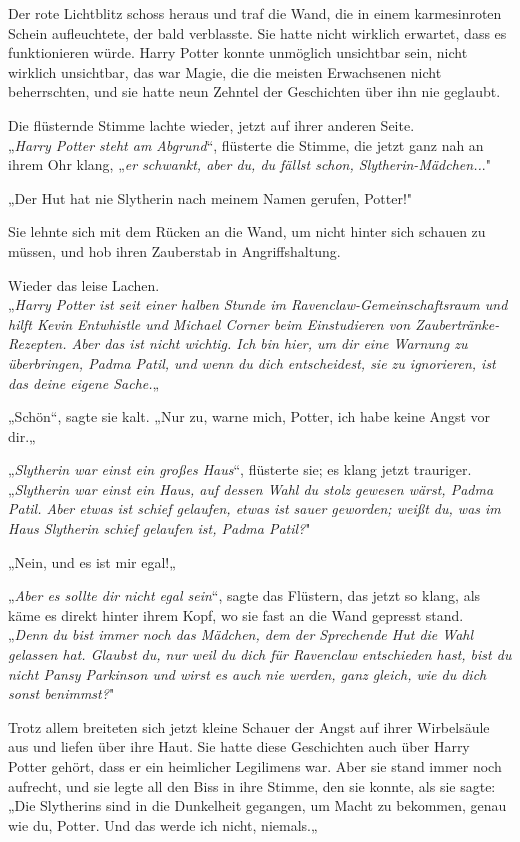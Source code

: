 {Der rote Lichtblitz schoss heraus und traf die Wand, die in einem karmesinroten Schein aufleuchtete, der bald verblasste. Sie hatte nicht wirklich erwartet, dass es funktionieren würde. Harry Potter konnte unmöglich unsichtbar sein, nicht wirklich unsichtbar, das war Magie, die die meisten Erwachsenen nicht beherrschten, und sie hatte neun Zehntel der Geschichten über ihn nie geglaubt.

Die flüsternde Stimme lachte wieder, jetzt auf ihrer anderen Seite.\\ „\emph{Harry Potter steht am Abgrund}“, flüsterte die Stimme, die jetzt ganz nah an ihrem Ohr klang, „\emph{er schwankt, aber du, du fällst schon, Slytherin-Mädchen..}."

„Der Hut hat nie Slytherin nach meinem Namen gerufen, Potter!"

Sie lehnte sich mit dem Rücken an die Wand, um nicht hinter sich schauen zu müssen, und hob ihren Zauberstab in Angriffshaltung.

Wieder das leise Lachen.\\ „\emph{Harry Potter ist seit einer halben Stunde im Ravenclaw-Gemeinschaftsraum und hilft Kevin Entwhistle und Michael Corner beim Einstudieren von Zaubertränke-Rezepten. Aber das ist nicht wichtig. Ich bin hier, um dir eine Warnung zu überbringen, Padma Patil, und wenn du dich entscheidest, sie zu ignorieren, ist das deine eigene Sache.}„

„Schön“, sagte sie kalt. „Nur zu, warne mich, Potter, ich habe keine Angst vor dir.„

„\emph{Slytherin war einst ein großes Haus}“, flüsterte sie; es klang jetzt trauriger.\\ „\emph{Slytherin war einst ein Haus, auf dessen Wahl du stolz gewesen wärst, Padma Patil. Aber etwas ist schief gelaufen, etwas ist sauer geworden; weißt du, was im Haus Slytherin schief gelaufen ist, Padma Patil?}"

„Nein, und es ist mir egal!„

„\emph{Aber es sollte dir nicht egal sein}“, sagte das Flüstern, das jetzt so klang, als käme es direkt hinter ihrem Kopf, wo sie fast an die Wand gepresst stand.\\ „\emph{Denn du bist immer noch das Mädchen, dem der Sprechende Hut die Wahl gelassen hat. Glaubst du, nur weil du dich für Ravenclaw entschieden hast, bist du nicht Pansy Parkinson und wirst es auch nie werden, ganz gleich, wie du dich sonst benimmst?}"

Trotz allem breiteten sich jetzt kleine Schauer der Angst auf ihrer Wirbelsäule aus und liefen über ihre Haut. Sie hatte diese Geschichten auch über Harry Potter gehört, dass er ein heimlicher Legilimens war. Aber sie stand immer noch aufrecht, und sie legte all den Biss in ihre Stimme, den sie konnte, als sie sagte:\\ „Die Slytherins sind in die Dunkelheit gegangen, um Macht zu bekommen, genau wie du, Potter. Und das werde ich nicht, niemals.„

}
